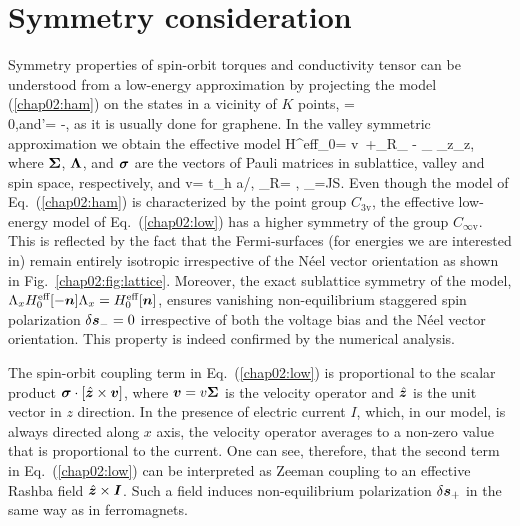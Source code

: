 \section{Symmetry consideration} 

Symmetry properties of spin-orbit torques and conductivity tensor can be understood from a low-energy approximation by projecting the model (\ref{chap02:ham}) on the states in a vicinity of $K$ points, 
\be
{}= \\ 0\epm,\quad\mbox{and}\quad {}'= -,
\e
as it is usually done for graphene. In the valley symmetric approximation we obtain the effective model
\be
\label{chap02:low}
H^\textrm{eff}_0= v\, \cdot\bb{\Sigma}+\alpha_\textrm{R}\lt[\bb{\sigma}\times\bb{\Sigma}\rt]_{} - \Delta_\,\cdot\bb{\sigma}\,\Sigma_z\Lambda_z,
\e
where $\boldsymbol{\Sigma}$, $\boldsymbol{\Lambda}$, and $\boldsymbol{\sigma}$ are the vectors of Pauli matrices in sublattice, valley and spin space, respectively, and 
\be
v=  t_h a/\hslash, \qquad \alpha_\textrm{R}=  \lambda , \qquad \Delta_=JS.
\e
Even though the model of Eq.~(\ref{chap02:ham}) is characterized by the point group $C_\textrm{3v}$, the effective low-energy model of Eq.~(\ref{chap02:low}) has a higher symmetry 
of the group $C_{\infty\textrm{v}}$. This is reflected by the fact that the Fermi-surfaces (for energies we are interested in) remain entirely isotropic irrespective of the N\'eel vector orientation as shown in Fig.~\ref{chap02:fig:lattice}. Moreover, the exact sublattice symmetry of the model, $\Lambda_x H^\textrm{eff}_0[-\boldsymbol{n}] \Lambda_x =H^\textrm{eff}_0[\boldsymbol{n}]$, ensures vanishing non-equilibrium staggered spin polarization $\delta \boldsymbol{s}_-=0$ irrespective of both the voltage bias and the N\'eel vector orientation. This property is indeed confirmed by the numerical analysis. 

The spin-orbit coupling term in Eq.~(\ref{chap02:low}) is proportional to the scalar product $\boldsymbol{\sigma}\cdot \left[\hat{\boldsymbol{z}}\times \boldsymbol{v}\right]$, where $\boldsymbol{v}=v\boldsymbol{\Sigma}$ is the velocity operator and $\hat{\boldsymbol{z}}$ is the unit vector in $z$ direction. In the presence of electric current $I$, which, in our model, is always directed along $x$ axis, the velocity operator averages to a non-zero value that is proportional to the current. One can see, therefore, that the second term in Eq.~(\ref{chap02:low}) can be interpreted as Zeeman coupling to an effective Rashba field $\hat{\boldsymbol{z}}\times \boldsymbol{I}$. Such a field induces non-equilibrium polarization $\delta\boldsymbol{s}_+$ in the same way as in ferromagnets. 


